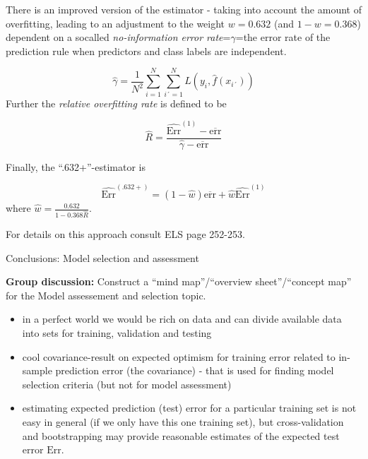 \documentclass[
  ignorenonframetext,
]{beamer}
\providecommand{\tightlist}{%
  \setlength{\itemsep}{0pt}\setlength{\parskip}{0pt}}
\begin{document}
\begin{frame}

There is an improved version of the estimator - taking into account the
amount of overfitting, leading to an adjustment to the weight
\(w=0.632\) (and \(1-w=0.368\)) dependent on a socalled
\emph{no-information error rate}=\(\gamma\)=the error rate of the
prediction rule when predictors and class labels are independent.

\[\hat{\gamma}=\frac{1}{N^2}\sum_{i=1}^{N}\sum_{i´=1}^N L(y_i,\hat{f}(x_{i´}))\]
Further the \emph{relative overfitting rate} is defined to be

\[ \hat{R}=\frac{\widehat{\text{Err}}^{(1)}-\overline{\text{err}}}{\hat{\gamma}-\overline{\text{err}}}\]

\end{frame}

\begin{frame}

Finally, the ``.632+''-estimator is

\[\widehat{\text{Err}}^{(.632+)}=(1-\hat{w}) \overline{\text{err}}+ \hat{w} \widehat{\text{Err}}^{(1)}\]
where \(\hat{w}=\frac{0.632}{1-0.368 \hat{R}}\).

For details on this approach consult ELS page 252-253.

\end{frame}

\begin{frame}{Conclusions: Model selection and assessment}
\protect\hypertarget{conclusions-model-selection-and-assessment}{}

\textbf{Group discussion:} Construct a ``mind map''/``overview
sheet''/``concept map'' for the Model assessement and selection topic.

\end{frame}

\begin{frame}

\begin{itemize}
\tightlist
\item
  in a perfect world we would be rich on data and can divide available
  data into sets for training, validation and testing
\item
  cool covariance-result on expected optimism for training error related
  to in-sample prediction error (the covariance) - that is used for
  finding model selection criteria (but not for model assessment)
\item
  estimating expected prediction (test) error for a particular training
  set is not easy in general (if we only have this one training set),
  but cross-validation and bootstrapping may provide reasonable
  estimates of the expected test error \(\text{Err}\).
\end{itemize}

\end{frame}
\end{document}
